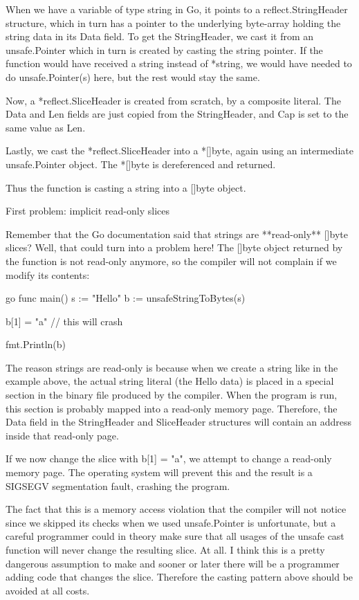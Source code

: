 When we have a variable of type string in Go, it points to a reflect.StringHeader structure, which in turn has a
pointer to the underlying byte-array holding the string data in its Data field. To get the StringHeader, we cast
it from an unsafe.Pointer which in turn is created by casting the string pointer. If the function would have received
a string instead of *string, we would have needed to do unsafe.Pointer(s) here, but the rest would stay the same.

Now, a *reflect.SliceHeader is created from scratch, by a composite literal. The Data and Len fields are just
copied from the StringHeader, and Cap is set to the same value as Len.

Lastly, we cast the *reflect.SliceHeader into a *[]byte, again using an intermediate unsafe.Pointer object. The
*[]byte is dereferenced and returned.

Thus the function is casting a string into a []byte object.


 First problem: implicit read-only slices

Remember that the Go documentation said that strings
are **read-only** []byte slices? Well, that could turn into a problem here! The []byte object returned by the
function is not read-only anymore, so the compiler will not complain if we modify its contents:

go
func main() 
    s := "Hello"
    b := unsafeStringToBytes(s)

    b[1] = "a" // this will crash

    fmt.Println(b)



The reason strings are read-only is because when we create a string like in the example above, the actual string literal
(the Hello data) is placed in a special section in the binary file produced by the compiler. When the program is run,
this section is probably mapped into a read-only memory page. Therefore, the Data field in the StringHeader and
SliceHeader structures will contain an address inside that read-only page.

If we now change the slice with b[1] = "a", we attempt to change a read-only memory page. The operating system will
prevent this and the result is a SIGSEGV segmentation fault, crashing the program.

The fact that this is a memory access violation that the compiler will not notice since we skipped its checks when we
used unsafe.Pointer is unfortunate, but a careful programmer could in theory make sure that all usages of the unsafe
cast function will never change the resulting slice. At all. I think this is a pretty dangerous assumption to make and
sooner or later there will be a programmer adding code that changes the slice. Therefore the casting pattern above
should be avoided at all costs.

